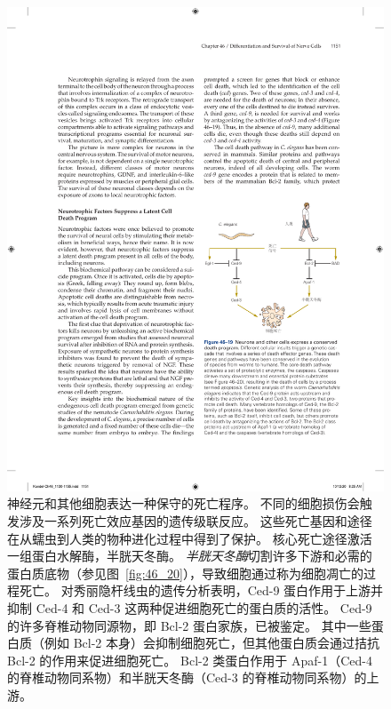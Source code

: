 \begin{figure}[htbp]
	\centering
	\includegraphics[width=0.9\linewidth]{chap46/fig_46_19}
	\caption{神经元和其他细胞表达一种保守的死亡程序。
	不同的细胞损伤会触发涉及一系列死亡效应基因的遗传级联反应。
	这些死亡基因和途径在从蠕虫到人类的物种进化过程中得到了保护。
	核心死亡途径激活一组蛋白水解酶，半胱天冬酶。
	\textit{半胱天冬酶}切割许多下游和必需的蛋白质底物（参见图~\ref{fig:46_20}），导致细胞通过称为细胞凋亡的过程死亡。
	对秀丽隐杆线虫的遗传分析表明，Ced-9 蛋白作用于上游并抑制 Ced-4 和 Ced-3 这两种促进细胞死亡的蛋白质的活性。
	Ced-9 的许多脊椎动物同源物，即 Bcl-2 蛋白家族，已被鉴定。
	其中一些蛋白质（例如 Bcl-2 本身）会抑制细胞死亡，但其他蛋白质会通过拮抗 Bcl-2 的作用来促进细胞死亡。
	Bcl-2 类蛋白作用于 Apaf-1（Ced-4 的脊椎动物同系物）和半胱天冬酶（Ced-3 的脊椎动物同系物）的上游。}
	\label{fig:46_19}
\end{figure}


